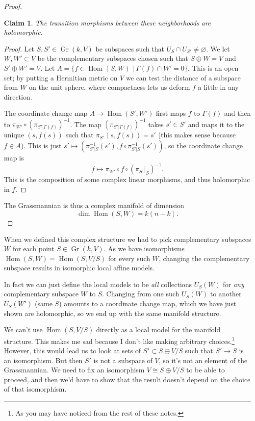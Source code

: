 \documentclass[10pt,a4paper]{article}
\newtheorem*{claim}{Claim}
\newtheorem*{proof}{Proof}
\def\qedhere{}
\DeclareMathOperator{\Gr}{Gr}
\DeclareMathOperator{\Hom}{Hom}
\begin{document}
\begin{proof}
\begin{claim}
  The transition morphisms between these neighborhoods are holomorphic.
\end{claim}

\begin{proof}
Let $S, S' \in \Gr(k,V)$ be subspaces such that $U_S \cap U_{S'} \not= \varnothing$. We let $W,W' \subset V$ be the complementary subspaces chosen such that $S \oplus W = V$ and $S' \oplus W' = V$. Let $A = \{ f \in \Hom(S, W) \mid \Gamma(f) \cap W' = 0 \}$. This is an open set; by putting a Hermitian metric on $V$ we can test the distance of a subspace from $W$ on the unit sphere, where compactness lets us deform $f$ a little in any direction.

The coordinate change map $A \to \Hom(S',W')$ first maps $f$ to $\Gamma(f)$ and then to $\pi_{W'} \circ (\pi_{S'|\Gamma(f)})^{-1}$. The map $(\pi_{S'|\Gamma(f)})^{-1}$ takes $s' \in S'$ and maps it to the unique $(s, f(s))$ such that $\pi_{S'}(s, f(s)) = s'$ (this makes sense because $f \in A$). This is just $s' \mapsto (\pi_{S'|S}^{-1}(s'), f \circ \pi_{S'|S}^{-1}(s'))$, so the coordinate change map is
$$
f \mapsto \pi_{W'} \circ f \circ (\pi_{S'}|_{S})^{-1}.
$$
This is the composition of some complex linear morphisms, and thus holomorphic in $f$.
\end{proof}

The Grassmannian is thus a complex manifold of dimension
\[
\dim \Hom(S, W) = k (n-k).
\qedhere
\]
\end{proof}

When we defined this complex structure we had to pick complementary subspaces $W$ for each point $S \in \Gr(k,V)$. As we have isomorphisms $\Hom(S, W) = \Hom(S, V/S)$ for every such $W$, changing the complementary subspace results in isomorphic local affine models.

In fact we can just define the local models to be \emph{all} collections $U_S(W)$ for \emph{any} complementary subspace $W$ to $S$. Changing from one such $U_S(W)$ to another $U_S(W')$ (same $S$) amounts to a coordinate change map, which we have just shown are holomorphic, so we end up with the same manifold structure.

We can't use $\Hom(S, V/S)$ directly as a local model for the manifold structure. This makes me sad because I don't like making arbitrary choices.\footnote{As you may have noticed from the rest of these notes.} However, this would lead us to look at sets of $S' \subset S \oplus V/S$ such that $S' \to S$ is an isomorphism. But then $S'$ is not a subspace of $V$, so it's not an element of the Grassmannian. We need to fix an isomorphism $V \cong S \oplus V/S$ to be able to proceed, and then we'd have to show that the result doesn't depend on the choice of that isomorphism.
\end{document}
